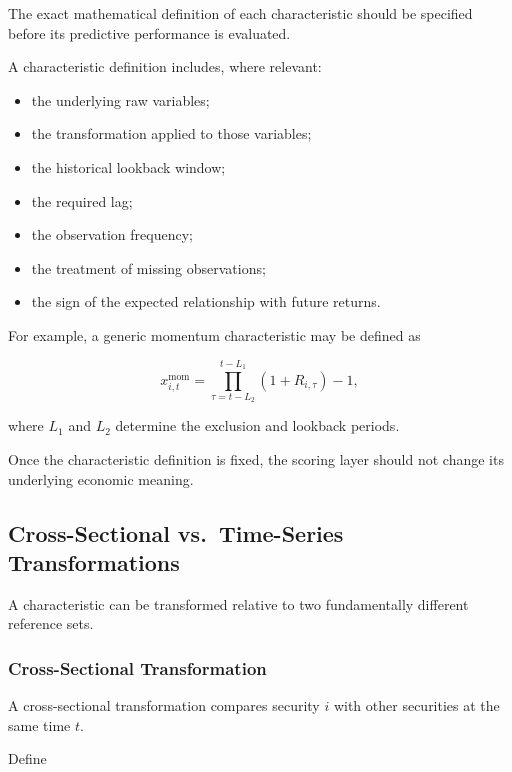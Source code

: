 \documentclass[11pt,a4paper]{article}
\begin{document}
The exact mathematical definition of each characteristic should be specified
before its predictive performance is evaluated.

A characteristic definition includes, where relevant:

\begin{itemize}
    \item the underlying raw variables;
    \item the transformation applied to those variables;
    \item the historical lookback window;
    \item the required lag;
    \item the observation frequency;
    \item the treatment of missing observations;
    \item the sign of the expected relationship with future returns.
\end{itemize}

For example, a generic momentum characteristic may be defined as

\begin{equation}
x_{i,t}^{\mathrm{mom}}
=
\prod_{\tau=t-L_2}^{t-L_1}
\left(
1+R_{i,\tau}
\right)
-1,
\end{equation}

where $L_1$ and $L_2$ determine the exclusion and lookback periods.

Once the characteristic definition is fixed, the scoring layer should not
change its underlying economic meaning.


\subsection{Cross-Sectional vs.\ Time-Series Transformations}
\label{subsec:cs_vs_ts_transformations}

A characteristic can be transformed relative to two fundamentally different
reference sets.


\subsubsection{Cross-Sectional Transformation}

A cross-sectional transformation compares security $i$ with other securities
at the same time $t$.

Define
\end{document}
